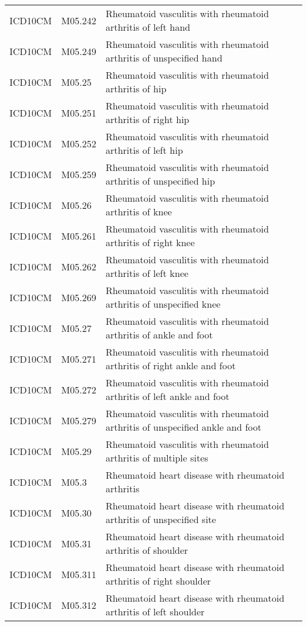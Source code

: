 \begin{table}[ht]
\begin{tabular}{lll}
  ICD10CM & M05.242 & Rheumatoid vasculitis with rheumatoid arthritis of left hand \\ 
  ICD10CM & M05.249 & Rheumatoid vasculitis with rheumatoid arthritis of unspecified hand \\ 
  ICD10CM & M05.25 & Rheumatoid vasculitis with rheumatoid arthritis of hip \\ 
  ICD10CM & M05.251 & Rheumatoid vasculitis with rheumatoid arthritis of right hip \\ 
  ICD10CM & M05.252 & Rheumatoid vasculitis with rheumatoid arthritis of left hip \\ 
  ICD10CM & M05.259 & Rheumatoid vasculitis with rheumatoid arthritis of unspecified hip \\ 
  ICD10CM & M05.26 & Rheumatoid vasculitis with rheumatoid arthritis of knee \\ 
  ICD10CM & M05.261 & Rheumatoid vasculitis with rheumatoid arthritis of right knee \\ 
  ICD10CM & M05.262 & Rheumatoid vasculitis with rheumatoid arthritis of left knee \\ 
  ICD10CM & M05.269 & Rheumatoid vasculitis with rheumatoid arthritis of unspecified knee \\ 
  ICD10CM & M05.27 & Rheumatoid vasculitis with rheumatoid arthritis of ankle and foot \\ 
  ICD10CM & M05.271 & Rheumatoid vasculitis with rheumatoid arthritis of right ankle and foot \\ 
  ICD10CM & M05.272 & Rheumatoid vasculitis with rheumatoid arthritis of left ankle and foot \\ 
  ICD10CM & M05.279 & Rheumatoid vasculitis with rheumatoid arthritis of unspecified ankle and foot \\ 
  ICD10CM & M05.29 & Rheumatoid vasculitis with rheumatoid arthritis of multiple sites \\ 
  ICD10CM & M05.3 & Rheumatoid heart disease with rheumatoid arthritis \\ 
  ICD10CM & M05.30 & Rheumatoid heart disease with rheumatoid arthritis of unspecified site \\ 
  ICD10CM & M05.31 & Rheumatoid heart disease with rheumatoid arthritis of shoulder \\ 
  ICD10CM & M05.311 & Rheumatoid heart disease with rheumatoid arthritis of right shoulder \\ 
  ICD10CM & M05.312 & Rheumatoid heart disease with rheumatoid arthritis of left shoulder \\ 

\end{tabular}
\end{table}

